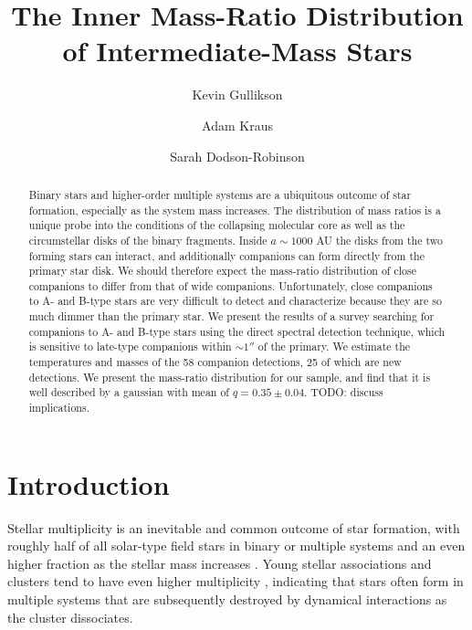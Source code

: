 \documentclass{emulateapj}
\begin{document}
\title{The Inner Mass-Ratio Distribution of Intermediate-Mass Stars}

\author{Kevin Gullikson }
\author{Adam Kraus }
\author{Sarah Dodson-Robinson }



\begin{abstract}
Binary stars and higher-order multiple systems are a ubiquitous outcome of star formation, especially as the system mass increases. The distribution of mass ratios is a unique probe into the conditions of the collapsing molecular core as well as the circumstellar disks of the binary fragments. Inside $a \sim 1000$ AU the disks from the two forming stars can interact, and additionally companions can form directly from the primary star disk. We should therefore expect the mass-ratio distribution of close companions to differ from that of wide companions. Unfortunately, close companions to A- and B-type stars are very difficult to detect and characterize because they are so much dimmer than the primary star. We present the results of a survey searching for companions to A- and B-type stars using the direct spectral detection technique, which is sensitive to late-type companions within $\sim 1''$ of the primary. We estimate the temperatures and masses of the 58 companion detections, 25 of which are new detections. We present the mass-ratio distribution for our sample, and find that it is well described by a gaussian with mean of $q = 0.35 \pm 0.04$. TODO: discuss implications.
\end{abstract}

\maketitle

\section{Introduction}


\label{sec:intro}

Stellar multiplicity is an inevitable and common outcome of star formation, with roughly half of all solar-type field stars in binary or multiple systems \citep{Raghavan2010} and an even higher fraction as the stellar mass increases \citep{Zinnecker2007}. Young stellar associations and clusters tend to have even higher multiplicity \citep{Duchene2013}, indicating that stars often form in multiple systems that are subsequently destroyed by dynamical interactions as the cluster dissociates. 
\end{document}
